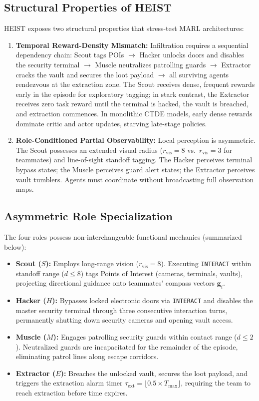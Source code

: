 \subsection{Structural Properties of HEIST}
HEIST exposes two structural properties that stress-test MARL architectures:
\begin{enumerate}[leftmargin=*,nosep]
    \item \textbf{Temporal Reward-Density Mismatch:} Infiltration requires a sequential dependency chain: Scout tags POIs $\to$ Hacker unlocks doors and disables the security terminal $\to$ Muscle neutralizes patrolling guards $\to$ Extractor cracks the vault and secures the loot payload $\to$ all surviving agents rendezvous at the extraction zone. The Scout receives dense, frequent rewards early in the episode for exploratory tagging; in stark contrast, the Extractor receives zero task reward until the terminal is hacked, the vault is breached, and extraction commences. In monolithic CTDE models, early dense rewards dominate critic and actor updates, starving late-stage policies.
    \item \textbf{Role-Conditioned Partial Observability:} Local perception is asymmetric. The Scout possesses an extended visual radius ($r_{\text{vis}} = 8$ vs.\ $r_{\text{vis}} = 3$ for teammates) and line-of-sight standoff tagging. The Hacker perceives terminal bypass states; the Muscle perceives guard alert states; the Extractor perceives vault tumblers. Agents must coordinate without broadcasting full observation maps.
\end{enumerate}

\subsection{Asymmetric Role Specialization}
The four roles possess non-interchangeable functional mechanics (summarized below):
\begin{itemize}[leftmargin=*,nosep]
    \item \textbf{Scout ($S$):} Employs long-range vision ($r_{\text{vis}} = 8$). Executing \texttt{INTERACT} within standoff range ($d \le 8$) tags Points of Interest (cameras, terminals, vaults), projecting directional guidance onto teammates' compass vectors $\mathbf{g}_i$.
    \item \textbf{Hacker ($H$):} Bypasses locked electronic doors via \texttt{INTERACT} and disables the master security terminal through three consecutive interaction turns, permanently shutting down security cameras and opening vault access.
    \item \textbf{Muscle ($M$):} Engages patrolling security guards within contact range ($d \le 2$). Neutralized guards are incapacitated for the remainder of the episode, eliminating patrol lines along escape corridors.
    \item \textbf{Extractor ($E$):} Breaches the unlocked vault, secures the loot payload, and triggers the extraction alarm timer $\tau_{\text{ext}} = \lfloor 0.5 \times T_{\max} \rfloor$, requiring the team to reach extraction before time expires.
\end{itemize}

